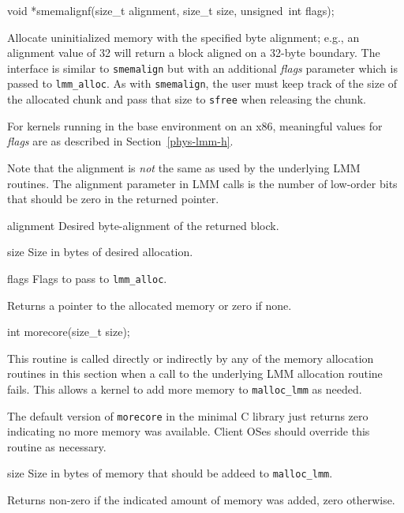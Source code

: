 \label{smemalignf}
\begin{apisyn}

	\funcproto void *smemalignf(size_t alignment, size_t size,
		 unsigned~int flags);
\end{apisyn}
\begin{apidesc}
	Allocate uninitialized memory with the specified byte alignment;
	e.g., an alignment value of 32 will return a block aligned on a
	32-byte boundary.
	The interface is similar to {\tt smemalign} but with an additional
	\emph{flags} parameter which is passed to {\tt lmm_alloc}.
	As with {\tt smemalign},
	the user must keep track of the size of the allocated chunk
	and pass that size to \texttt{sfree} when releasing the chunk.
	
	For kernels running in the base environment on an x86,
	meaningful values for \emph{flags} are as described in
	Section~\ref{phys-lmm-h}.

	Note that the alignment is \emph{not} the same as used by the
	underlying LMM routines.  The alignment parameter in LMM calls
	is the number of low-order bits that should be zero in the
	returned pointer.
\end{apidesc}
\begin{apiparm}
	\item[alignment]
		Desired byte-alignment of the returned block.
	\item[size]
		Size in bytes of desired allocation.
	\item[flags]
		Flags to pass to {\tt lmm_alloc}.
\end{apiparm}
\begin{apiret}
	Returns a pointer to the allocated memory or zero if none.
\end{apiret}

\label{morecore}
\begin{apisyn}

	\funcproto int morecore(size_t size);
\end{apisyn}
\begin{apidesc}
	This routine is called directly or indirectly by any of the
	memory allocation routines in this section when a call to the
	underlying LMM allocation routine fails.
	This allows a kernel to add more memory to {\tt malloc_lmm}
	as needed.

	The default version of {\tt morecore} in the minimal C library
	just returns zero indicating no more memory was available.
	Client OSes should override this routine as necessary.
\end{apidesc}
\begin{apiparm}
	\item[size]
		Size in bytes of memory that should be addeed to
		{\tt malloc_lmm}.
\end{apiparm}
\begin{apiret}
	Returns non-zero if the indicated amount of memory was added,
	zero otherwise.
\end{apiret}

